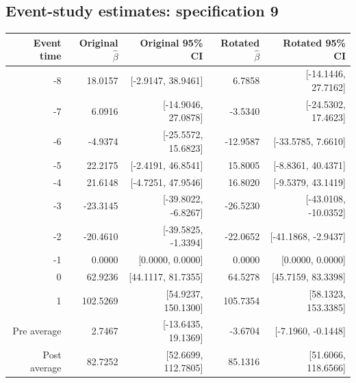 \documentclass[10pt]{article}
\begin{document}
\subsection*{Event-study estimates: specification 9}
\begin{center}\scriptsize
\begin{tabular}{r rr rr}
\toprule
Event time & Original $\hat\beta$ & Original 95\% CI & Rotated $\hat\beta$ & Rotated 95\% CI \\
\midrule
-8 & 18.0157 & [-2.9147, 38.9461] & 6.7858 & [-14.1446, 27.7162] \\
-7 & 6.0916 & [-14.9046, 27.0878] & -3.5340 & [-24.5302, 17.4623] \\
-6 & -4.9374 & [-25.5572, 15.6823] & -12.9587 & [-33.5785, 7.6610] \\
-5 & 22.2175 & [-2.4191, 46.8541] & 15.8005 & [-8.8361, 40.4371] \\
-4 & 21.6148 & [-4.7251, 47.9546] & 16.8020 & [-9.5379, 43.1419] \\
-3 & -23.3145 & [-39.8022, -6.8267] & -26.5230 & [-43.0108, -10.0352] \\
-2 & -20.4610 & [-39.5825, -1.3394] & -22.0652 & [-41.1868, -2.9437] \\
-1 & 0.0000 & [0.0000, 0.0000] & 0.0000 & [0.0000, 0.0000] \\
0 & 62.9236 & [44.1117, 81.7355] & 64.5278 & [45.7159, 83.3398] \\
1 & 102.5269 & [54.9237, 150.1300] & 105.7354 & [58.1323, 153.3385] \\
\midrule
Pre average & 2.7467 & [-13.6435, 19.1369] & -3.6704 & [-7.1960, -0.1448] \\
Post average & 82.7252 & [52.6699, 112.7805] & 85.1316 & [51.6066, 118.6566] \\
\bottomrule
\end{tabular}
\end{center}
\clearpage
\end{document}
